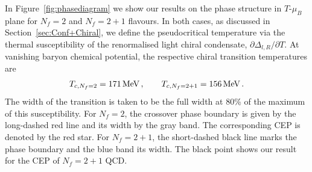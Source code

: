\documentclass[%
reprint,
superscriptaddress,
showpacs,preprintnumbers,
 amsmath,amssymb,
 aps,
prd,
]{revtex4-1}
\def\Fig#1{Figure~\ref{#1}}
\def\sec#1{Section~\ref{#1}}
\begin{document}
In \Fig{fig:phasediagram} we show our results on the phase structure
in $T$-$\mu_B$ plane for $N_f = 2$ and $N_f = 2+1$ flavours. In both
cases, as discussed in \sec{sec:Conf+Chiral}, we define the
pseudocritical temperature via the thermal susceptibility of the
renormalised light chiral condensate,
$\partial \Delta_{l,R}/\partial T$. At vanishing baryon chemical potential,
the respective chiral transition temperatures are 
%
\begin{align}\label{eq:Tcmu=0}
  T_{c,{\tiny{N_f=2}}}=171\,\textrm{MeV}\,,\qquad T_{c,{\tiny{N_f=2+1}}}
  =156\,\textrm{MeV}\,. 
\end{align}
%
The width of the transition is taken to be the full width at 80\% of
the maximum of this susceptibility.  For $N_f =2$, the crossover phase
boundary is given by the long-dashed red line and its width by the
gray band. The corresponding CEP is denoted by the red star. For
$N_f = 2+1$, the short-dashed black line marks the phase boundary and
the blue band its width. The black point shows our result for the CEP
of $N_f = 2+1$ QCD.
\end{document}
